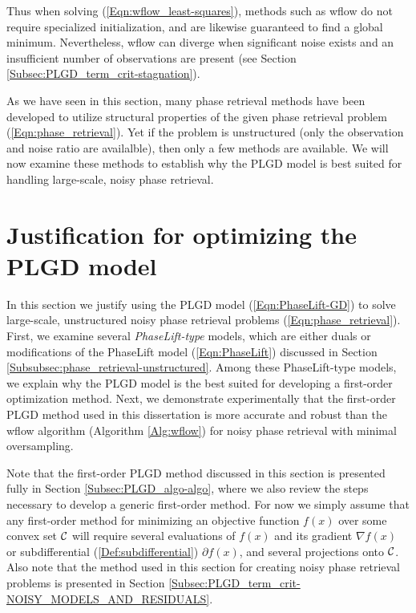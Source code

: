 Thus when solving (\ref{Eqn:wflow_least-squares}), methods such as wflow do not require specialized initialization, and are likewise guaranteed to find a global minimum.  Nevertheless, wflow can diverge when significant noise exists and an insufficient number of observations are present (see Section \ref{Subsec:PLGD_term_crit-stagnation}).



As we have seen in this section, many phase retrieval methods have been developed to utilize structural properties of the given phase retrieval problem (\ref{Eqn:phase_retrieval}).  Yet if the problem is unstructured (only the observation and noise ratio are availalble), then only a few methods are available.   We will now examine these methods to establish why the PLGD model is best suited for handling large-scale, noisy phase retrieval.




\section{Justification for optimizing the PLGD model}	\label{Subsubsec:phase_retrieval-why_optimize_PLGD_model}




In this section we justify using the PLGD model (\ref{Eqn:PhaseLift-GD}) to solve large-scale, unstructured noisy phase retrieval problems (\ref{Eqn:phase_retrieval}). 
First, we examine several \textit{PhaseLift-type} models, which are either duals or modifications of the PhaseLift model (\ref{Eqn:PhaseLift}) discussed in Section \ref{Subsubsec:phase_retrieval-unstructured}.
Among these PhaseLift-type models, we explain why the PLGD model is the best suited for developing a first-order optimization method.
Next, we demonstrate experimentally that the first-order PLGD method used in this dissertation is more accurate and robust than the wflow algorithm (Algorithm \ref{Alg:wflow}) for noisy phase retrieval with minimal oversampling.

Note that the first-order PLGD method discussed in this section is presented fully in Section \ref{Subsec:PLGD_algo-algo}, where we also 
review the steps necessary to develop a generic first-order method.  
For now we simply assume that any first-order method for minimizing an objective function $f(x)$ over some convex set ${\mathcal C}$ will require several evaluations of $f(x)$ and its gradient $\nabla f(x)$ or subdifferential (\ref{Def:subdifferential}) $\partial f(x)$, and several projections onto ${\mathcal C}$.
Also note that the method used in this section for creating noisy phase retrieval problems is presented in Section \ref{Subsec:PLGD_term_crit-NOISY_MODELS_AND_RESIDUALS}.





